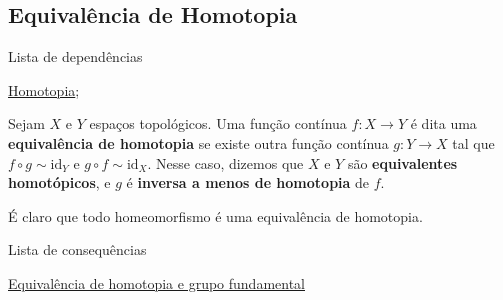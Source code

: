 \subsection{Equivalência de Homotopia}
\label{equiv-homotopia}
\begin{titlemize}{Lista de dependências}
	\item \hyperref[homotopia-def]{Homotopia};\\
\end{titlemize}

\begin{defi}
	Sejam $X$ e $Y$ espaços topológicos. Uma função contínua $f:X\to Y$ é dita uma \textbf{equivalência de homotopia} se existe outra função contínua $g:Y\to X$ tal que $f\circ g \sim \text{id}_Y$ e $g\circ f \sim \text{id}_X$. Nesse caso, dizemos que $X$ e $Y$ são \textbf{equivalentes homotópicos}, e $g$ é \textbf{inversa a menos de homotopia} de $f$.
\end{defi}

É claro que todo homeomorfismo é uma equivalência de homotopia.

\begin{titlemize}{Lista de consequências}
	\item \hyperref[equiv-homotopia-induz-iso]{Equivalência de homotopia e grupo fundamental}
\end{titlemize}

